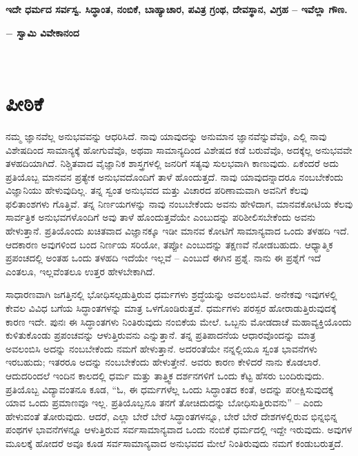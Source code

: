 \begin{center}
\textbf{ಇದೇ ಧರ್ಮದ ಸರ್ವಸ್ವ. ಸಿದ್ಧಾಂತ, ನಂಬಿಕೆ, ಬಾಹ್ಯಾಚಾರ, ಪವಿತ್ರ ಗ್ರಂಥ, ದೇವಸ್ಥಾನ, ವಿಗ್ರಹ – ಇವೆಲ್ಲಾ ಗೌಣ.}
\end{center}

\begin{flushright}
\textbf{$-$ ಸ್ವಾಮಿ ವಿವೇಕಾನಂದ}
\end{flushright}
~

\vfill
\vskip 5cm

\chapter{ಪೀಠಿಕೆ}

ನಮ್ಮ ಜ್ಞಾನವೆಲ್ಲ ಅನುಭವವನ್ನು ಆಧರಿಸಿದೆ. ನಾವು ಯಾವುದನ್ನು ಅನುಮಾನ ಜ್ಞಾನವೆನ್ನುವೆವೊ, ಎಲ್ಲಿ ನಾವು ವಿಶೇಷದಿಂದ ಸಾಮಾನ್ಯಕ್ಕೆ ಹೋಗುವೆವೊ, ಅಥವಾ ಸಾಮಾನ್ಯದಿಂದ ವಿಶೇಷದ ಕಡೆ ಬರುವೆವೊ, ಅದಕ್ಕೆಲ್ಲ ಅನುಭವವೇ ತಳಹದಿಯಾಗಿದೆ. ನಿಶ್ಚಿತವಾದ ವೈಜ್ಞಾನಿಕ ಶಾಸ್ತ್ರಗಳಲ್ಲಿ ಜನರಿಗೆ ಸತ್ಯವು ಸುಲಭವಾಗಿ ಕಾಣುವುದು. ಏಕೆಂದರೆ ಅದು ಪ್ರತಿಯೊಬ್ಬ ಮಾನವನ ಪ್ರತ್ಯೇಕ ಅನುಭವದೊಂದಿಗೆ ತಾಳೆ ಹೊಂದುತ್ತದೆ. ನಾವು ಯಾವುದನ್ನಾದರೂ ನಂಬಬೇಕೆಂದು ವಿಜ್ಞಾನಿಯು ಹೇಳುವುದಿಲ್ಲ. ತನ್ನ ಸ್ವಂತ ಅನುಭವದ ಮತ್ತು ವಿಚಾರದ ಪರಿಣಾಮವಾಗಿ ಅವನಿಗೆ ಕೆಲವು ಫಲಿತಾಂಶಗಳು ಗೊತ್ತಿವೆ. ತನ್ನ ನಿರ್ಣಯಗಳನ್ನು ನಾವು ನಂಬಬೇಕೆಂದು ಅವನು ಹೇಳಿದಾಗ, ಮಾನವಕೋಟಿಯ ಕೆಲವು ಸಾರ್ವತ್ರಿಕ ಅನುಭವಗಳೊಂದಿಗೆ ಅವು ತಾಳೆ ಹೊಂದುತ್ತವೆಯೇ ಎಂಬುದನ್ನು ಪರಿಶೀಲಿಸಬೇಕೆಂದು ಅವನು ಹೇಳುತ್ತಾನೆ. ಪ್ರತಿಯೊಂದು ಖಚಿತವಾದ ವಿಜ್ಞಾನಕ್ಕೂ ಇಡೀ ಮಾನವ ಕೋಟಿಗೆ ಸಾಮಾನ್ಯವಾದ ಒಂದು ತಳಹದಿ ಇದೆ. ಆದಕಾರಣ ಅವುಗಳಿಂದ ಬಂದ ನಿರ್ಣಯ ಸರಿಯೋ, ತಪ್ಪೋ ಎಂಬುದನ್ನು ತಕ್ಷಣವೆ ನೋಡಬಹುದು. ಆಧ್ಯಾತ್ಮಿಕ ಪ್ರಪಂಚದಲ್ಲಿ ಅಂತಹ ಒಂದು ತಳಹದಿ ಇದೆಯೇ ಇಲ್ಲವೆ – ಎಂಬುದೆ ಈಗಿನ ಪ್ರಶ್ನೆ. ನಾನು ಈ ಪ್ರಶ್ನೆಗೆ ಇದೆ ಎಂತಲೂ, ಇಲ್ಲವೆಂತಲೂ ಉತ್ತರ ಹೇಳಬೇಕಾಗಿದೆ.

\vskip 5pt

ಸಾಧಾರಣವಾಗಿ ಜಗತ್ತಿನಲ್ಲಿ ಭೋಧಿಸಲ್ಪಡುತ್ತಿರುವ ಧರ್ಮಗಳು ಶ್ರದ್ಧೆಯನ್ನು ಅವಲಂಬಿಸಿವೆ. ಅನೇಕವು ಇವುಗಳಲ್ಲಿ ಕೇವಲ ವಿವಿಧ ಬಗೆಯ ಸಿದ್ಧಾಂತಗಳನ್ನು ಮಾತ್ರ ಒಳಗೊಂಡಿರುತ್ತವೆ. ಧರ್ಮಗಳು ಪರಸ್ಪರ ಹೋರಾಡುತ್ತಿರುವುದಕ್ಕೆ ಕಾರಣ ಇದೇ. ಪುನಃ ಈ ಸಿದ್ಧಾಂತಗಳು ನಿಂತಿರುವುದು ನಂಬಿಕೆಯ ಮೇಲೆ. ಒಬ್ಬನು ಮೋಡದಾಚೆ ಮಹಾವ್ಯಕ್ತಿಯೊಂದು ಕುಳಿತುಕೊಂಡು ಪ್ರಪಂಚವನ್ನು ಆಳುತ್ತಿರುವನು ಎನ್ನುತ್ತಾನೆ. ತನ್ನ ಪ್ರತಿಪಾದನೆಯ ಆಧಾರವೊಂದನ್ನು ಮಾತ್ರ ಅವಲಂಬಿಸಿ ಅದನ್ನು ನಂಬಬೇಕೆಂದು ನಮಗೆ ಹೇಳುತ್ತಾನೆ. ಅದರಂತೆಯೇ ನನ್ನಲ್ಲಿಯೂ ಸ್ವಂತ ಭಾವನೆಗಳು ಇರಬಹುದು; ಇತರರೂ ಅದನ್ನು ನಂಬಬೇಕೆಂದು ಹೇಳುತ್ತೇನೆ. ಅವರು ಕಾರಣ ಕೇಳಿದರೆ ನಾನು ಕೊಡಲಾರೆ. ಆದುದರಿಂದಲೆ ಇಂದಿನ ಕಾಲದಲ್ಲಿ ಧರ್ಮ ಮತ್ತು ತಾತ್ತ್ವಿಕ ದರ್ಶನಗಳಿಗೆ ಒಂದು ಕೆಟ್ಟ ಹೆಸರು ಬಂದಿರುವುದು. ಪ್ರತಿಯೊಬ್ಬ ವಿದ್ಯಾವಂತನೂ ಕೂಡ, “ಓ, ಈ ಧರ್ಮಗಳೆಲ್ಲ ಒಂದು ಸಿದ್ಧಾಂತದ ಕಂತೆ, ಅದನ್ನು ಪರೀಕ್ಷಿಸುವುದಕ್ಕೆ ಯಾವ ಒಂದು ಪ್ರಮಾಣವೂ ಇಲ್ಲ. ಪ್ರತಿಯೊಬ್ಬನೂ ತನಗೆ ತೋಚಿದುದನ್ನು ಬೋಧಿಸುತ್ತಿರುವನು” – ಎಂದು ಹೇಳುವಂತೆ ತೋರುವುದು. ಆದರೆ, ಎಲ್ಲಾ ಬೇರೆ ಬೇರೆ ಸಿದ್ಧಾಂತಗಳನ್ನೂ, ಬೇರೆ ಬೇರೆ ದೇಶಗಳಲ್ಲಿರುವ ಭಿನ್ನಭಿನ್ನ ಪಂಥಗಳ ಭಾವನೆಗಳನ್ನೂ ಆಳುತ್ತಿರುವ ಸರ್ವಸಾಮಾನ್ಯವಾದ ಒಂದು ನಂಬಿಕೆ ಧರ್ಮದಲ್ಲಿ ಇದ್ದೇ ಇರುವುದು. ಅವುಗಳ ಮೂಲಕ್ಕೆ ಹೋದರೆ ಅವೂ ಕೂಡ ಸರ್ವಸಾಮಾನ್ಯವಾದ ಅನುಭವದ ಮೇಲೆ ನಿಂತಿರುವುದು ನಮಗೆ ಕಂಡುಬರುತ್ತದೆ. 

